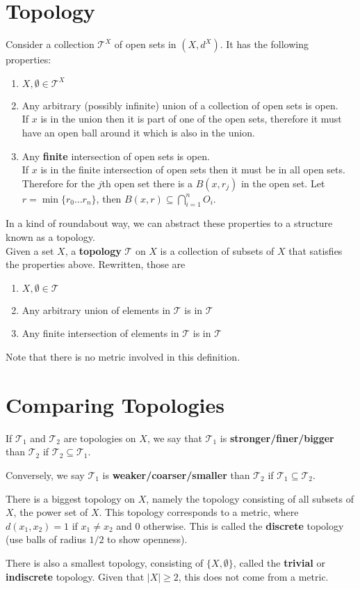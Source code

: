 \documentclass[11pt]{article}
\begin{document}
\section{Topology}
Consider a collection $\mathcal{T}^X$ of open sets in $(X, d^X)$. It has the following properties:
\begin{enumerate}
	\item $X, \emptyset \in \mathcal{T}^X$
	\item Any arbitrary (possibly infinite) union of a collection of open sets is open.\\
		If $x$ is in the union then it is part of one of the open sets, therefore it must have an open ball around it which is also in the union.
	\item Any \textbf{finite} intersection of open sets is open.\\
		If $x$ is in the finite intersection of open sets then it must be in all open sets. Therefore for the $j$th open set there is a $B(x, r_j)$ in the open set. Let $r = \min\{r_0\ldots r_n\}$, then $B(x, r) \subseteq \bigcap_{i=1}^{n} O_i$.
\end{enumerate}

In a kind of roundabout way, we can abstract these properties to a structure known as a topology.\\
 Given a set $X$, a \textbf{topology} $\mathcal{T}$ on $X$ is a collection of subsets of $X$ that satisfies the properties above. Rewritten, those are
\begin{enumerate}
	\item $X, \emptyset \in \mathcal{T}$
	\item Any arbitrary union of elements in $\mathcal{T}$ is in $\mathcal{T}$
	\item Any finite intersection of elements in $\mathcal{T}$ is in $\mathcal{T}$
\end{enumerate}

Note that there is no metric involved in this definition.

\section{Comparing Topologies}
If $\mathcal{T}_1$ and $\mathcal{T}_2$ are topologies on $X$, we say that $\mathcal{T}_1$ is \textbf{stronger/finer/bigger} than $\mathcal{T}_2$ if $\mathcal{T}_2 \subseteq \mathcal{T}_1$. 

Conversely, we say $\mathcal{T}_1$ is \textbf{weaker/coarser/smaller} than $\mathcal{T}_2$ if $\mathcal{T}_1 \subseteq \mathcal{T}_2$.

There is a biggest topology on $X$, namely the topology consisting of all subsets of $X$, the power set of $X$. This topology corresponds to a metric, where $d(x_1, x_2) = 1$ if $x_1 \neq x_2$ and $0$ otherwise. This is called the \textbf{discrete} topology (use balls of radius $1/2$ to show openness).

There is also a smallest topology, consisting of $\{X, \emptyset\}$, called the \textbf{trivial} or \textbf{indiscrete} topology. Given that $|X| \geq 2$, this does not come from a metric.
\end{document}
